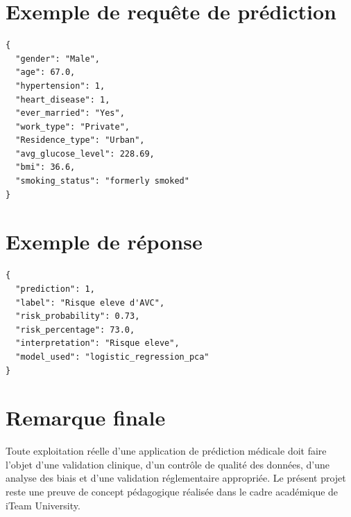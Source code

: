 \documentclass[12pt,a4paper]{report}
\newcommand{\institution}{iTeam University}
\begin{document}
\section{Exemple de requête de prédiction}
\begin{lstlisting}[caption={Exemple JSON envoyé à l'API}]
{
  "gender": "Male",
  "age": 67.0,
  "hypertension": 1,
  "heart_disease": 1,
  "ever_married": "Yes",
  "work_type": "Private",
  "Residence_type": "Urban",
  "avg_glucose_level": 228.69,
  "bmi": 36.6,
  "smoking_status": "formerly smoked"
}
\end{lstlisting}

\section{Exemple de réponse}
\begin{lstlisting}[caption={Exemple de réponse de prédiction}]
{
  "prediction": 1,
  "label": "Risque eleve d'AVC",
  "risk_probability": 0.73,
  "risk_percentage": 73.0,
  "interpretation": "Risque eleve",
  "model_used": "logistic_regression_pca"
}
\end{lstlisting}

\section{Remarque finale}
Toute exploitation réelle d'une application de prédiction médicale doit faire l'objet d'une validation clinique, d'un contrôle de qualité des données, d'une analyse des biais et d'une validation réglementaire appropriée. Le présent projet reste une preuve de concept pédagogique réalisée dans le cadre académique de \institution.
\end{document}
